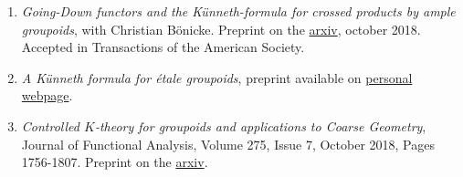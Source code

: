 \documentclass[a4paper]{article}
\begin{document}
\begin{enumerate}
\item \textit{Going-Down functors and the Künneth-formula for crossed products by ample groupoids}, with Christian Bönicke. Preprint on the \href{https://arxiv.org/abs/1810.04415}{arxiv}, october 2018. Accepted in Transactions of the American Society.\\

\item \textit{A K\"{u}nneth formula for \'etale groupoids}, preprint available on \href{http://math.hawaii.edu/~dellaiera/Research.html}{personal webpage}.\\

\item \textit{Controlled $K$-theory for groupoids and applications to Coarse Geometry}, Journal of Functional Analysis, Volume 275, Issue 7, October 2018, Pages 1756-1807. Preprint on the \href{https://arxiv.org/abs/1710.06099}{arxiv}. 
\end{enumerate}

\newpage

 
\end{document}

